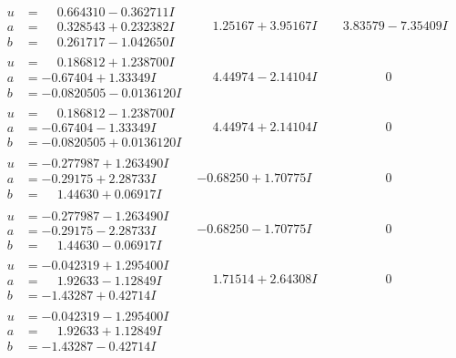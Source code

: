 \documentclass[1p]{elsarticle_modified}
\theoremstyle{definition}
\begin{document}
$$\begin{array}{c|c|c}
\begin{aligned}
u &= \phantom{-}0.664310 - 0.362711 I \\
a &= \phantom{-}0.328543 + 0.232382 I \\
b &= \phantom{-}0.261717 - 1.042650 I\end{aligned}
 & \phantom{-}1.25167 + 3.95167 I & \phantom{-}3.83579 - 7.35409 I \\ \hline\begin{aligned}
u &= \phantom{-}0.186812 + 1.238700 I \\
a &= -0.67404 + 1.33349 I \\
b &= -0.0820505 - 0.0136120 I\end{aligned}
 & \phantom{-}4.44974 - 2.14104 I & \phantom{-0.000000 } 0 \\ \hline\begin{aligned}
u &= \phantom{-}0.186812 - 1.238700 I \\
a &= -0.67404 - 1.33349 I \\
b &= -0.0820505 + 0.0136120 I\end{aligned}
 & \phantom{-}4.44974 + 2.14104 I & \phantom{-0.000000 } 0 \\ \hline\begin{aligned}
u &= -0.277987 + 1.263490 I \\
a &= -0.29175 + 2.28733 I \\
b &= \phantom{-}1.44630 + 0.06917 I\end{aligned}
 & -0.68250 + 1.70775 I & \phantom{-0.000000 } 0 \\ \hline\begin{aligned}
u &= -0.277987 - 1.263490 I \\
a &= -0.29175 - 2.28733 I \\
b &= \phantom{-}1.44630 - 0.06917 I\end{aligned}
 & -0.68250 - 1.70775 I & \phantom{-0.000000 } 0 \\ \hline\begin{aligned}
u &= -0.042319 + 1.295400 I \\
a &= \phantom{-}1.92633 - 1.12849 I \\
b &= -1.43287 + 0.42714 I\end{aligned}
 & \phantom{-}1.71514 + 2.64308 I & \phantom{-0.000000 } 0 \\ \hline\begin{aligned}
u &= -0.042319 - 1.295400 I \\
a &= \phantom{-}1.92633 + 1.12849 I \\
b &= -1.43287 - 0.42714 I\end{aligned}

\end{array}$$
\end{document}
